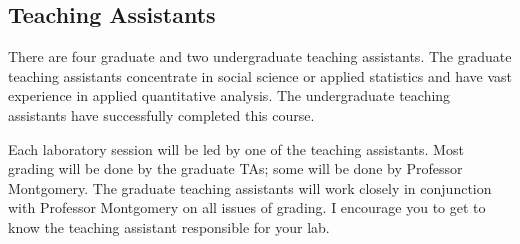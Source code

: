 \documentclass[11pt]{article}
\begin{document}
\newpage



\subsection*{Teaching Assistants}

There are four graduate and two undergraduate teaching assistants. The graduate teaching assistants concentrate
in social science or applied statistics and have vast experience in
applied quantitative analysis.  The undergraduate teaching assistants
have successfully completed this course.  

Each laboratory session will be led by one of the teaching assistants. Most grading will be done by the graduate TAs; some will
be done by Professor Montgomery.  The graduate teaching assistants will work closely in conjunction with Professor Montgomery on all issues of grading. I encourage you to get to know the teaching assistant responsible for your lab.

\vspace{.4cm}
\end{document}
